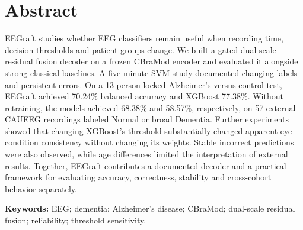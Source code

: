 \chapter*{Abstract}
EEGraft studies whether EEG classifiers remain useful when recording time, decision thresholds and patient groups change. We built a gated dual-scale residual fusion decoder on a frozen CBraMod encoder and evaluated it alongside strong classical baselines. A five-minute SVM study documented changing labels and persistent errors. On a 13-person locked Alzheimer's-versus-control test, EEGraft achieved 70.24\% balanced accuracy and XGBoost 77.38\%. Without retraining, the models achieved 68.38\% and 58.57\%, respectively, on 57 external CAUEEG recordings labeled Normal or broad Dementia. Further experiments showed that changing XGBoost's threshold substantially changed apparent eye-condition consistency without changing its weights. Stable incorrect predictions were also observed, while age differences limited the interpretation of external results. Together, EEGraft contributes a documented decoder and a practical framework for evaluating accuracy, correctness, stability and cross-cohort behavior separately.
\par\medskip
\noindent\textbf{Keywords:} EEG; dementia; Alzheimer's disease; CBraMod; dual-scale residual fusion; reliability; threshold sensitivity.
